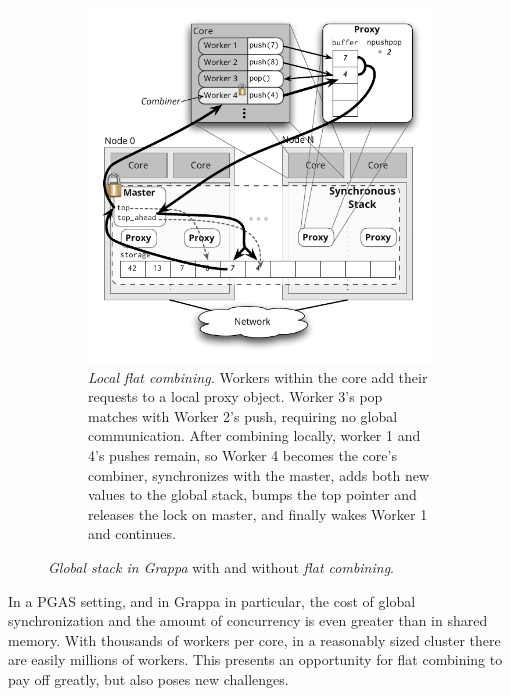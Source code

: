 \begin{figure}[t]
\begin{subfigure}[b]{0.43\textwidth}
    \includegraphics[width=\textwidth]{figs/stack_fc.pdf}
    \caption{\emph{Local flat combining.}
      Workers within the core add their requests to a local proxy object. Worker 3's pop matches with Worker 2's push, requiring no global communication. After combining locally, worker 1 and 4's pushes remain, so Worker 4 becomes the core's combiner, synchronizes with the master, adds both new values to the global stack, bumps the top pointer and releases the lock on master, and finally wakes Worker 1 and continues.
    }
    \label{fig:stackfc}
  \end{subfigure}
  \caption{\emph{Global stack in Grappa} with and without \emph{flat combining}.}
  \label{fig:stack}
\end{figure}

In a PGAS setting, and in Grappa in particular, the cost of global synchronization and the amount of concurrency is even greater than in shared memory. With thousands of workers per core, in a reasonably sized cluster there are easily millions of workers. This presents an opportunity for flat combining to pay off greatly, but also poses new challenges.


